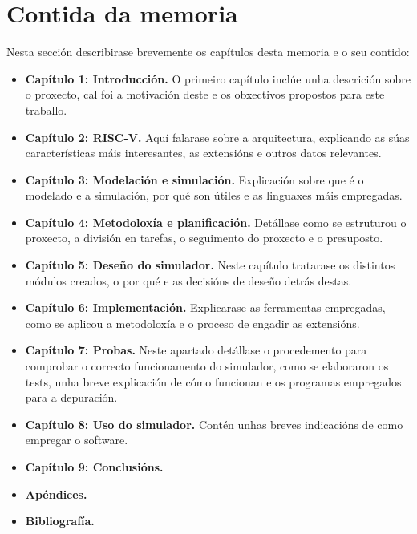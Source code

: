 \section{Contida da memoria}
\label{sec:contido_memoria}
Nesta sección describirase brevemente os capítulos desta memoria e o seu contido: 
\begin{itemize}
    \item \textbf{Capítulo 1: Introducción.}  O primeiro capítulo inclúe unha descrición sobre o proxecto, cal foi a motivación deste e os obxectivos propostos para este traballo.
    \item \textbf{Capítulo 2: RISC-V.} Aquí falarase sobre a arquitectura, explicando as súas características máis interesantes, as extensións e outros datos relevantes.
    \item \textbf{Capítulo 3: Modelación e simulación.} Explicación sobre que é o modelado e a simulación, por qué son útiles e as linguaxes máis empregadas.
    \item \textbf{Capítulo 4: Metodoloxía e planificación.} Detállase como se estruturou o proxecto, a división en tarefas, o seguimento do proxecto e o presuposto.
    \item \textbf{Capítulo 5: Deseño do simulador.} Neste capítulo tratarase os distintos módulos creados, o por qué e as decisións de deseño detrás destas.
    \item \textbf{Capítulo 6: Implementación.} Explicarase as ferramentas empregadas, como se aplicou a metodoloxía e o proceso de engadir as extensións.
    \item \textbf{Capítulo 7: Probas.} Neste apartado detállase o procedemento para comprobar o correcto funcionamento do simulador, como se elaboraron os tests, unha breve explicación de cómo funcionan e os programas empregados para a depuración.
    \item \textbf{Capítulo 8: Uso do simulador.} Contén unhas breves indicacións de como empregar o software.
    \item \textbf{Capítulo 9: Conclusións.}
    \item \textbf{Apéndices. }
    \item \textbf{Bibliografía. }
    
\end{itemize}

